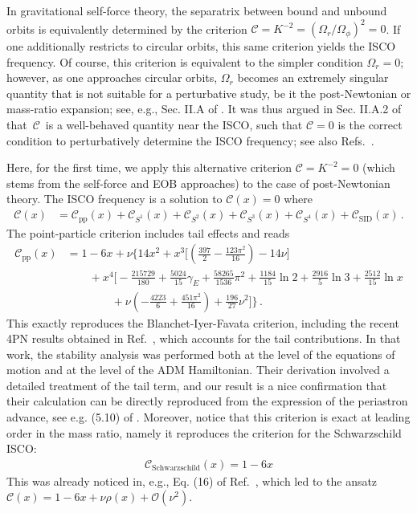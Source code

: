\documentclass[prd,superscriptaddress,preprintnumbers,tightenlines,nofootinbib, eqsecnum]{revtex4-2}
\newcommand{\nn}{\nonumber}
\begin{document}
In gravitational self-force theory, the separatrix between bound and unbound orbits is equivalently determined by the criterion $\mathcal{C} = K^{-2}=(\Omega_r/\Omega_\phi)^2 = 0$. If one additionally restricts to circular orbits, this same criterion yields the ISCO frequency. Of course, this criterion is equivalent to the simpler condition $\Omega_r = 0$; however, as one approaches circular orbits, $\Omega_r$ becomes an extremely singular quantity that is not suitable for a perturbative study, be it the post-Newtonian or mass-ratio expansion; see, e.g., Sec. II.A of \cite{Barack:2011ed}. It was thus argued in Sec. II.A.2 of \cite{Barack:2010ny} that~$\mathcal{C}$~is a well-behaved quantity near the ISCO, such that $\mathcal{C}=0$ is the correct condition to perturbatively determine the ISCO frequency; see also Refs.~\cite{Barack:2010tm, Trestini:2026tky}.

Here, for the first time, we apply this alternative criterion $\mathcal{C} = K^{-2} = 0$ (which stems from the self-force and EOB approaches) to the case of post-Newtonian theory. The ISCO frequency is a solution to $\mathcal{C}(x)=0$ where
\begin{align}
    \mathcal{C}(x)&=\mathcal{C}_\text{pp}(x)+\mathcal{C}_{S^1}(x)+\mathcal{C}_{S^2}(x)+\mathcal{C}_{S^3}(x)+\mathcal{C}_{S^4}(x)+\mathcal{C}_\text{SID}(x)\,.
\end{align}
The point-particle criterion includes tail effects and reads
\begin{align}
    \mathcal{C}_\text{pp}(x) &= 1-6 x+ \nu \Bigg\{14 x^2   +x^3 \Bigg[\left(\frac{397}{2}-\frac{123 \pi ^2}{16}\right) -14 \nu \Bigg]\nn\\
    &\qquad +x^4 \Bigg[-\frac{215729}{180}+\frac{5024}{15}\gamma_E+\frac{58265}{1536}\pi
   ^2+\frac{1184}{15}\ln 2+\frac{2916}{5} \ln 3+\frac{2512}{15} \ln x \nn\\
   &\qquad\qquad + \nu\left(-\frac{4223}{6}+\frac{451 \pi
   ^2}{16}\right)  +\frac{196}{27}\nu^2  \Bigg] \Bigg\} \,.
\end{align}
This exactly reproduces the Blanchet-Iyer-Favata criterion, including the recent 4PN results obtained in Ref.~\cite{Blanchet:2025agj}, which accounts for the tail contributions. In that work, the stability analysis was performed both at the level of the equations of motion and at the level of the ADM Hamiltonian. Their derivation involved a detailed treatment of the tail term, and our result is a nice confirmation that their calculation can be directly reproduced from the expression of the periastron advance, see e.g. (5.10) of \cite{Bernard:2017ktp}. Moreover, notice that this criterion is exact at leading order in the mass ratio, namely it reproduces the criterion for the Schwarzschild ISCO:
\begin{align}
    \mathcal{C}_\text{Schwarzschild}(x)=1-6x
\end{align}
This was already noticed in, e.g., Eq. (16) of Ref.~\cite{Barack:2010ny}, which led to the ansatz~$\mathcal{C}(x)=1-6x+\nu \rho(x)+\mathcal{O}(\nu^2)$.
\end{document}
